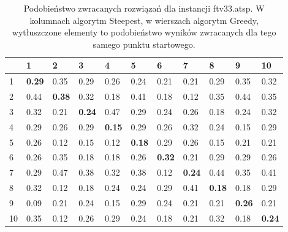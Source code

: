 \begin{table}[h!]
	\centering
       \begin{tabular}{|l|l|l|l|l|l|l|l|l|l|l|}
        \hline
		& 1 & 2 & 3 & 4 & 5 & 6 & 7 & 8 & 9 & 10 \\
		\hline
		1 & \textbf{0.29} & 0.35 & 0.29 & 0.26 & 0.24 & 0.21 & 0.21 & 0.29 & 0.35 & 0.32 \\    
		2 & 0.44 & \textbf{0.38} & 0.32 & 0.18 & 0.41 & 0.18 & 0.12 & 0.35 & 0.44 & 0.35 \\    
		3 & 0.32 & 0.21 & \textbf{0.24} & 0.47 & 0.29 & 0.24 & 0.26 & 0.18 & 0.24 & 0.32 \\ 
		4 &	0.29 & 0.26 & 0.29 & \textbf{0.15} & 0.29 & 0.26 & 0.32 & 0.24 & 0.15 & 0.29 \\   
		5 & 0.26 & 0.12 & 0.15 & 0.12 & \textbf{0.18} & 0.29 & 0.26 & 0.15 & 0.21 & 0.21 \\   
		6 & 0.26 & 0.35 & 0.18 & 0.18 & 0.26 & \textbf{0.32} & 0.21 & 0.29 & 0.29 & 0.26 \\   
		7 & 0.29 & 0.47 & 0.38 & 0.32 & 0.38 & 0.12 & \textbf{0.24} & 0.44 & 0.35 & 0.41 \\   
		8 & 0.32 & 0.12 & 0.18 & 0.24 & 0.24 & 0.29 & 0.41 & \textbf{0.18} & 0.18 & 0.29 \\   
		9 & 0.09 & 0.21 & 0.24 & 0.15 & 0.29 & 0.24 & 0.21 & 0.21 & \textbf{0.26} & 0.21 \\   
		10 & 0.35 & 0.12 & 0.26 & 0.29 & 0.24 & 0.18 & 0.21 & 0.32 & 0.18 & \textbf{0.24} \\
		\hline
		\end{tabular}
		\caption{Podobieństwo zwracanych rozwiązań dla instancji ftv33.atsp. W kolumnach algorytm Steepest, w wierszach algorytm Greedy, wytłuszczone elementy to podobieństwo wyników zwracanych dla tego samego punktu startowego.}
		\label{tab:sim_33}
\end{table}

